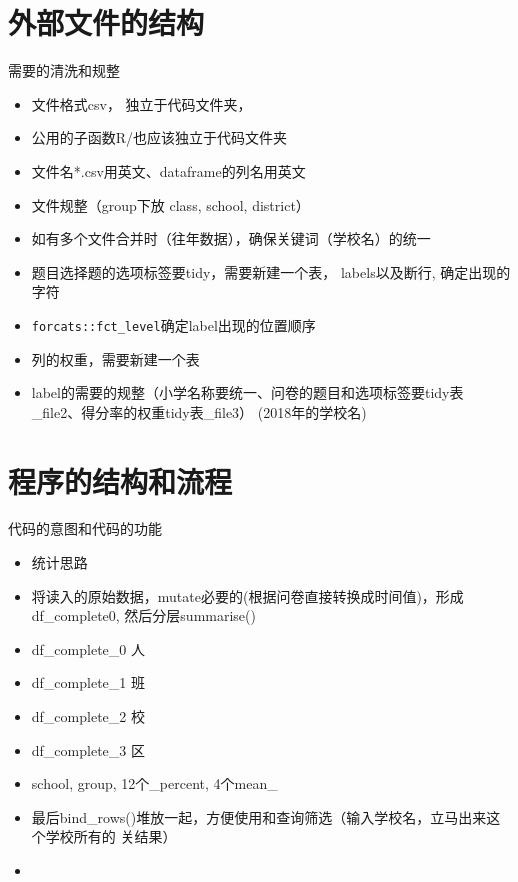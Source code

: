 \documentclass[hyperref, a4paper, UTF8, zihao = -4, linespread = 1]{ctexbook}
\providecommand{\tightlist}{%
  \setlength{\itemsep}{0pt}\setlength{\parskip}{0pt}}
\begin{document}
\hypertarget{ux5916ux90e8ux6587ux4ef6ux7684ux7ed3ux6784}{%
\section{外部文件的结构}\label{ux5916ux90e8ux6587ux4ef6ux7684ux7ed3ux6784}}

需要的清洗和规整

\begin{itemize}
\tightlist
\item
  文件格式csv， 独立于代码文件夹，
\item
  公用的子函数R/也应该独立于代码文件夹
\item
  文件名*.csv用英文、dataframe的列名用英文
\item
  文件规整（group下放 class, school, district）
\item
  如有多个文件合并时（往年数据），确保关键词（学校名）的统一
\item
  题目选择题的选项标签要tidy，需要新建一个表， labels以及断行, 确定出现的字符
\item
  \texttt{forcats::fct\_level}确定label出现的位置顺序
\item
  列的权重，需要新建一个表
\item
  label的需要的规整（小学名称要统一、问卷的题目和选项标签要tidy表\_file2、得分率的权重tidy表\_file3） (2018年的学校名)
\end{itemize}

\hypertarget{ux7a0bux5e8fux7684ux7ed3ux6784ux548cux6d41ux7a0b}{%
\section{程序的结构和流程}\label{ux7a0bux5e8fux7684ux7ed3ux6784ux548cux6d41ux7a0b}}

代码的意图和代码的功能

\begin{itemize}
\item
  统计思路
\item
  将读入的原始数据，mutate必要的(根据问卷直接转换成时间值)，形成df\_complete0,
  然后分层summarise()
\item
  df\_complete\_0 人
\item
  df\_complete\_1 班
\item
  df\_complete\_2 校
\item
  df\_complete\_3 区
\item
  school, group, 12个\_percent, 4个mean\_
\item
  最后bind\_rows()堆放一起，方便使用和查询筛选（输入学校名，立马出来这个学校所有的 关结果）
\item
\end{itemize}
\end{document}
